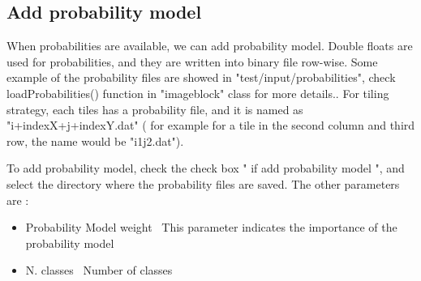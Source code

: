 \documentclass[10pt,a4paper]{article}
\begin{document}
\subsection{ Add probability model }

When probabilities are available,  we can add probability model. Double floats are used for probabilities, and they are written into binary file row-wise. Some example of the probability files are showed in "test/input/probabilities",  check loadProbabilities() function in "imageblock" class for more details.. 
For tiling strategy, each tiles has a probability file, and it is named as "i+indexX+j+indexY.dat" ( for example for a tile in the second column and third row, the name would be "i1j2.dat").

To add probability model, check the check box " if add probability model ", and select the directory where the probability files are saved. The other parameters are :

\begin{itemize}
	\item Probability Model weight \ This parameter indicates the importance of the probability model
	\item N. classes \ Number of classes 
\end{itemize}
\end{document}
